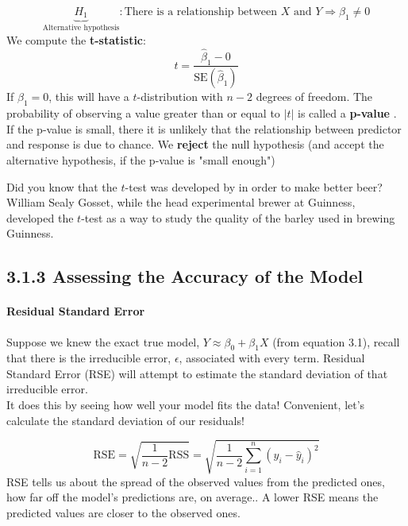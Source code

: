          \begin{equation*}\tag{3.13}
            \underbrace{H_1}_{\text{Alternative hypothesis}}: \text{There is a relationship between } X \text{ and } Y\Longrightarrow \beta_1 \neq 0
         \end{equation*}
         We compute the \textbf{t-statistic}:
         \begin{equation*}\tag{3.14}
             t = \frac{\hat \beta_1-0}{\text{SE}(\hat \beta_1)}
          \end{equation*}
          If $\beta_1 = 0$, this will have a $t$-distribution with $n-2$ degrees of freedom.  The probability of observing a value greater than or equal to $|t|$ is called a \textbf{p-value} .  If the p-value is small, there it is unlikely that the relationship between predictor and response is due to chance.
         We \textbf{reject} the null hypothesis (and accept the alternative hypothesis, if the p-value is "small enough")
         
         \begin{interesting}
             Did you know that the $t$-test was developed by in order to make better beer?  William Sealy Gosset, while the head experimental brewer at Guinness, developed the $t$-test as a way to study the quality of the barley used in brewing Guinness.
         \end{interesting}

        \subsection*{3.1.3 Assessing the Accuracy of the Model}
        \paragraph{Residual Standard Error\\}
        Suppose we knew the exact true model, $Y\approx \beta_0+\beta_1 X$ (from equation 3.1), recall that there is the irreducible error, $\epsilon$, associated with every term.  Residual Standard Error (RSE) will attempt to estimate the standard deviation of that irreducible error.\\
        
        It does this by seeing how well your model fits the data!  Convenient, let's calculate the standard deviation of our residuals!  
        
        \begin{equation*}\tag{3.15}
            \text{RSE} = \sqrt{\frac{1}{n-2}\text{RSS}} = \sqrt{\frac{1}{n-2}\sum_{i=1}^n(y_i - \hat y_i)^2}
        \end{equation*}
        RSE tells us about the spread of the observed values from the predicted ones, how far off the model's predictions are, on average..  A lower RSE means the predicted values are closer to the observed ones.\\
        
